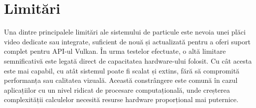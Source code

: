 \section{Limitări}
Una dintre principalele limitări ale sistemului de particule este nevoia unei plăci video dedicate sau integrate, suficient de nouă și actualizată pentru a oferi suport complet pentru API-ul Vulkan. În urma testelor efectuate, o altă limitare semnificativă este legată direct de capacitatea hardware-ului folosit. Cu cât acesta este mai capabil, cu atât sistemul poate fi scalat și extins, fără să compromită performanța sau calitatea vizuală. Această constrângere este comună în cazul aplicațiilor cu un nivel ridicat de procesare computațională, unde creșterea complexității calculelor necesită resurse hardware proporțional mai puternice. 

